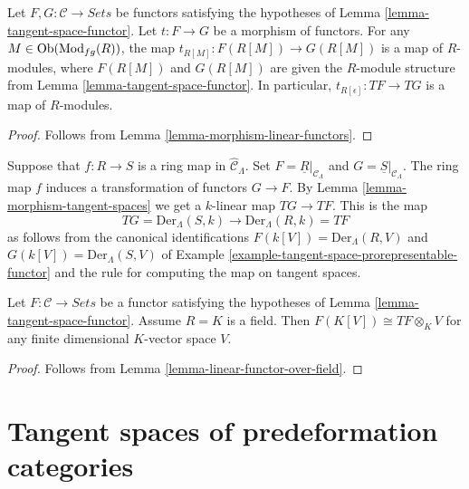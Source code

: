 \begin{lemma}
\label{lemma-morphism-tangent-spaces}
Let $F, G: \mathcal{C} \to \textit{Sets}$ be functors satisfying
the hypotheses of
Lemma \ref{lemma-tangent-space-functor}.
Let $t : F \to G$ be a morphism of functors. For any
$M \in \mathop{\rm Ob}\nolimits(\text{Mod}_{fg}(R))$, the map
$t_{R[M]}: F(R[M]) \to G(R[M])$ is a map of $R$-modules, where
$F(R[M])$ and $G(R[M])$ are given the $R$-module structure from
Lemma \ref{lemma-tangent-space-functor}.
In particular, $t_{R[\epsilon]} : TF \to TG$ is a map of $R$-modules.
\end{lemma}

\begin{proof}
Follows from
Lemma \ref{lemma-morphism-linear-functors}.
\end{proof}

\begin{example}
\label{example-tangent-space-map-prorepresentable-functor}
Suppose that $f : R \to S$ is a ring map in $\widehat{\mathcal{C}}_\Lambda$.
Set $F = \underline{R}|_{\mathcal{C}_\Lambda}$ and
$G = \underline{S}|_{\mathcal{C}_\Lambda}$. The ring map
$f$ induces a transformation of functors $G \to F$. By
Lemma \ref{lemma-morphism-tangent-spaces}
we get a $k$-linear map $TG \to TF$. This is the map
$$
TG = \text{Der}_\Lambda(S, k) \longrightarrow \text{Der}_\Lambda(R, k) = TF
$$
as follows from the canonical identifications
$F(k[V]) = \text{Der}_\Lambda(R, V)$ and
$G(k[V]) = \text{Der}_\Lambda(S, V)$ of
Example \ref{example-tangent-space-prorepresentable-functor}
and the rule for computing the map on tangent spaces.
\end{example}

\begin{lemma}
\label{lemma-tangent-space-tensor}
Let $F: \mathcal{C} \to \textit{Sets}$ be a functor satisfying the
hypotheses of
Lemma \ref{lemma-tangent-space-functor}.
Assume $R = K$ is a field. Then $F(K[V]) \cong TF \otimes_K V$
for any finite dimensional $K$-vector space $V$.
\end{lemma}

\begin{proof}
Follows from
Lemma \ref{lemma-linear-functor-over-field}.
\end{proof}






\section{Tangent spaces of predeformation categories}
\label{section-tangent-spaces}

